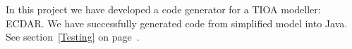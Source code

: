 In this project we have developed a code generator for a TIOA modeller:
ECDAR. We have successfully generated code from simplified model into Java. See
section~\ref{Testing} on page~\pageref{Testing}.





